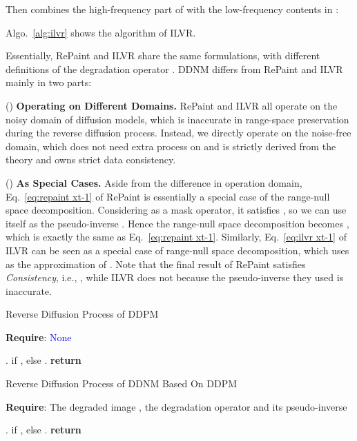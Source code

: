 \documentclass{article} \usepackage{iclr2023_conference,times}
\begin{document}
Then combines the high-frequency part of  with the low-frequency contents in :

Algo.~\ref{alg:ilvr} shows the algorithm of ILVR. 

Essentially, RePaint and ILVR share the same formulations, with different definitions of the degradation operator . DDNM differs from RePaint and ILVR mainly in two parts: 

() \textbf{Operating on Different Domains.} RePaint and ILVR all operate on the noisy  domain of diffusion models, which is inaccurate in range-space preservation during the reverse diffusion process. Instead, we directly operate on the noise-free  domain, which does not need extra process on  and is strictly derived from the theory and owns strict data consistency. 

() \textbf{As Special Cases.} Aside from the difference in operation domain, Eq.~\ref{eq:repaint xt-1} of RePaint is essentially a special case of the range-null space decomposition. Considering  as a mask operator, it satisfies , so  we can use  itself as the pseudo-inverse . Hence the range-null space decomposition becomes , which is exactly the same as Eq.~\ref{eq:repaint xt-1}. Similarly, Eq.~\ref{eq:ilvr xt-1} of ILVR can be seen as a special case of range-null space decomposition, which uses  as the approximation of . Note that the final result  of RePaint satisfies \textit{Consistency}, i.e., , while ILVR does not because the pseudo-inverse  they used is inaccurate.   

\begin{algorithm}\caption{Reverse Diffusion Process of DDPM}
\label{alg:ddpm}
\textbf{Require}: \textcolor{blue}{None}
\begin{algorithmic}[1] \State .
\For{}
\State  if , else .
\State 
\EndFor
\State \textbf{return} 
\end{algorithmic}
\end{algorithm}

\begin{algorithm}
\caption{Reverse Diffusion Process of DDNM Based On DDPM}
\label{alg:ddnm appendix version}
\textbf{Require}: The degraded image , the degradation operator  and its pseudo-inverse 
\begin{algorithmic}[1] \State .
\For{}
\State  if , else .
\State 
\State 
\State 
\EndFor
\State \textbf{return} 
\end{algorithmic}
\end{algorithm}
\end{document}
